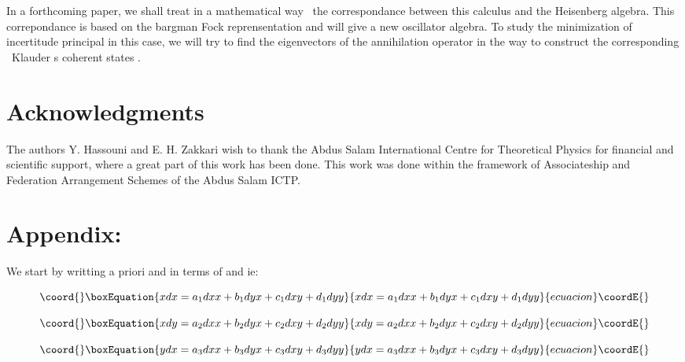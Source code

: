 \documentclass[a4paper,12pt,thmsa]{article}
\begin{document}
In a forthcoming paper, we shall treat in a mathematical way \ the
correspondance between this calculus and the Heisenberg algebra. This
correpondance is based on the bargman Fock reprensentation and will give a
new oscillator algebra. To study the minimization of incertitude principal
in this case, we will try to find the eigenvectors of the annihilation
operator in the way to construct the corresponding \ Klauder s coherent
states \myHighlight{$\left[ 13\right] $}\coordHE{}.

\vspace{0.5cm}

\section*{Acknowledgments}

The authors Y. Hassouni and E. H. Zakkari wish to thank the Abdus Salam
International Centre for Theoretical Physics for financial and scientific
support, where a great part of this work has been done. This work was done
within the framework of Associateship and Federation Arrangement  Schemes of
the Abdus Salam ICTP.\textbf{\ }

\newpage

\section*{Appendix:}

We start by writting a priori \coordHE{}  \coordHE{}  \coordHE{} and \coordHE{} in terms of \coordHE{}  \coordHE{}  \coordHE{} and \coordHE{} ie:

\begin{equation}\coord{}\boxEquation{
xdx=a_1dxx+b_1dyx+c_1dxy+d_1dyy
}{
xdx=a_1dxx+b_1dyx+c_1dxy+d_1dyy
}{ecuacion}\coordE{}\end{equation}

\begin{equation}\coord{}\boxEquation{
xdy=a_2dxx+b_2dyx+c_2dxy+d_2dyy
}{
xdy=a_2dxx+b_2dyx+c_2dxy+d_2dyy
}{ecuacion}\coordE{}\end{equation}

\begin{equation}\coord{}\boxEquation{
ydx=a_3dxx+b_3dyx+c_3dxy+d_3dyy
}{
ydx=a_3dxx+b_3dyx+c_3dxy+d_3dyy
}{ecuacion}\coordE{}\end{equation}
\end{document}
